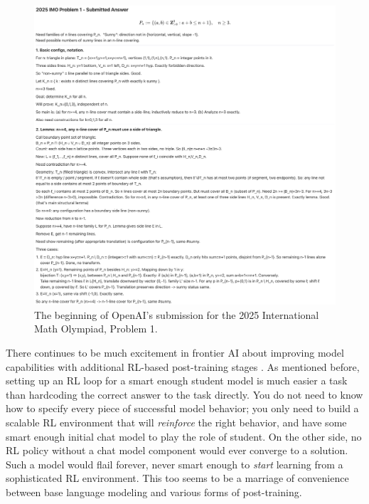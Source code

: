 \begin{figure}[ht]
\centering
\includegraphics[scale=.19]{./images/IMO_Gold.png}
\caption[From Alexander Wei, OpenAI. Complete answer transcripts are available
    in \cite{wei2025imo}]{ The beginning of OpenAI's submission for the 2025
    International Math Olympiad, Problem 1. }
\label{imoGold}
\end{figure}

There continues to be much excitement in frontier AI about improving model
capabilities with additional RL-based post-training stages
\cite{silver2025experience}. As mentioned before, setting up an RL loop for a
smart enough student model is much easier a task than hardcoding the correct
answer to the task directly. You do not need to know how to specify every piece
of successful model behavior; you only need to build a scalable RL environment
that will \emph{reinforce} the right behavior, and have some smart enough
initial chat model to play the role of student. On the other side, no RL policy
without a chat model component would ever converge to a solution. Such a model
would flail forever, never smart enough to \emph{start} learning from a
sophisticated RL environment. This too seems to be a marriage of convenience
between base language modeling and various forms of post-training.

